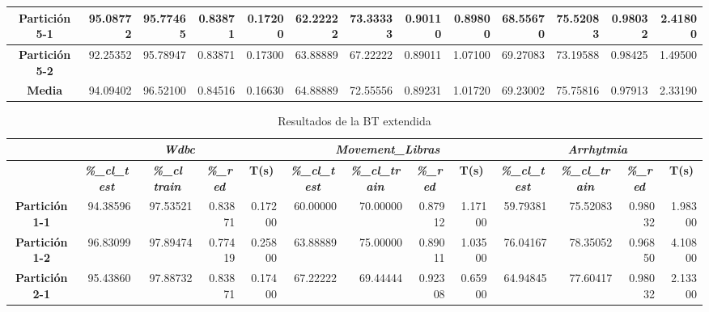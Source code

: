 \documentclass[a4paper,11pt]{article}
\begin{document}
\begin{table}[htbp]
\begin{adjustbox}{width=1.1\textwidth}
\begin{tabular}{|c|r|r|r|r|r|r|r|r|r|r|r|r|}
    \textbf{Partición 5-1} & 95.08772 & 95.77465 & 0.83871 & 0.17200 & 62.22222 & 73.33333 & 0.90110 & 0.89800 & 68.55670 & 75.52083 & 0.98032 & 2.41800 \\ \hline
    \textbf{Partición 5-2} & 92.25352 & 95.78947 & 0.83871 & 0.17300 & 63.88889 & 67.22222 & 0.89011 & 1.07100 & 69.27083 & 73.19588 & 0.98425 & 1.49500 \\ \hline
    \textbf{Media} & 94.09402 & 96.52100 & 0.84516 & 0.16630 & 64.88889 & 72.55556 & 0.89231 & 1.01720 & 69.23002 & 75.75816 & 0.97913 & 2.33190 \\ \hline
    \end{tabular}
    \end{adjustbox}
    \label{BT}
  \end{table}  
  
  \begin{table}[htbp]	
    \caption*{Resultados de la BT extendida}
    \begin{adjustbox}{width=1.1\textwidth}
    \begin{tabular}{|c|r|r|r|r|r|r|r|r|r|r|r|r|}
    \hline
    \multicolumn{1}{|l|}{} & \multicolumn{ 4}{c|}{\textbf{\textit{Wdbc}}} & \multicolumn{ 4}{c|}{\textbf{\textit{Movement\_Libras}}} & \multicolumn{ 4}{c|}{\textbf{\textit{Arrhytmia}}} \\ \hline
    \multicolumn{1}{|l|}{} & \multicolumn{1}{c|}{\textbf{\textit{\%\_cl\_test}}} & \multicolumn{1}{c|}{\textbf{\textit{\%\_cl train}}} & \multicolumn{1}{c|}{\textbf{\textit{\%\_red}}} & \multicolumn{1}{c|}{\textbf{T(s)}} & \multicolumn{1}{c|}{\textbf{\textit{\%\_cl\_test}}} & \multicolumn{1}{c|}{\textbf{\textit{\%\_cl\_train}}} & \multicolumn{1}{c|}{\textbf{\textit{\%\_red}}} & \multicolumn{1}{c|}{\textbf{T(s)}} & \multicolumn{1}{c|}{\textbf{\textit{\%\_cl\_test}}} & \multicolumn{1}{c|}{\textbf{\textit{\%\_cl\_train}}} & \multicolumn{1}{c|}{\textbf{\textit{\%\_red}}} & \multicolumn{1}{c|}{\textbf{T(s)}} \\ \hline
    \textbf{Partición 1-1} & 94.38596 & 97.53521 & 0.83871 & 0.17200 & 60.00000 & 70.00000 & 0.87912 & 1.17100 & 59.79381 & 75.52083 & 0.98032 & 1.98300 \\ \hline
    \textbf{Partición 1-2} & 96.83099 & 97.89474 & 0.77419 & 0.25800 & 63.88889 & 75.00000 & 0.89011 & 1.03500 & 76.04167 & 78.35052 & 0.96850 & 4.10800 \\ \hline
    \textbf{Partición 2-1} & 95.43860 & 97.88732 & 0.83871 & 0.17400 & 67.22222 & 69.44444 & 0.92308 & 0.65900 & 64.94845 & 77.60417 & 0.98032 & 2.13300 \\ \hline

\end{tabular}
\end{adjustbox}
\end{table}
\end{document}
